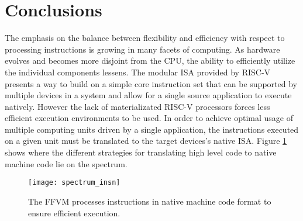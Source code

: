 \section{Conclusions}
\label{insn:concl}
The emphasis on the balance between flexibility and efficiency with respect to
processing instructions is growing in many facets of computing. As hardware
evolves and becomes more disjoint from the CPU, the ability to efficiently
utilize the individual components lessens. The modular ISA provided by RISC-V
presents a way to build on a simple core instruction set that can be supported
by multiple devices in a system and allow for a single source application to
execute natively. However the lack of materializated RISC-V processors forces
less efficient execution environments to be used. In order to achieve optimal
usage of multiple computing units driven by a single application, the
instructions executed on a given unit must be translated to the target devices's
native ISA. Figure \ref{spectrum_insn} shows where the different strategies for
translating high level code to native machine code lie on the spectrum.

\begin{figure}[h!]
  \centering
  \texttt{[image: spectrum\_insn]}
  \caption{The FFVM processes instructions in native machine code format to
  ensure efficient execution.}
  \label{spectrum_insn}
\end{figure}
